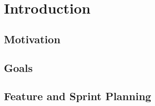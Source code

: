 \chapter{Introduction}

\section{Motivation}

\section{Goals}

\section{Feature and Sprint Planning}